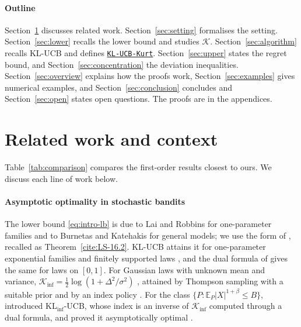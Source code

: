 \documentclass[11pt]{article}
\newcommand{\E}{\mathbb{E}}
\newcommand{\algo}{\hyperref[alg:kucb]{\texttt{KL-UCB-Kurt}}}
\begin{document}
\paragraph{Outline} Section~\ref{sec:related} discusses related work. Section~\ref{sec:setting} formalises
the setting. Section~\ref{sec:lower} recalls the lower bound and studies $\mathcal K$.
Section~\ref{sec:algorithm} recalls KL-UCB and defines \algo{}. Section~\ref{sec:upper} states the regret
bound, and Section~\ref{sec:concentration} the deviation inequalities. Section~\ref{sec:overview}
explains how the proofs work, Section~\ref{sec:examples} gives numerical examples, and
Section~\ref{sec:conclusion} concludes and Section~\ref{sec:open} states open questions. The proofs are in the
appendices.

\section{Related work and context}\label{sec:related}

Table~\ref{tab:comparison} compares the first-order results closest to ours. We discuss each line of
work below.

\paragraph{Asymptotic optimality in stochastic bandits} The lower bound \eqref{eq:intro-lb} is due to Lai
and Robbins for one-parameter families and to Burnetas and Katehakis for general models; we use the
form of \citet[Theorem~16.2]{LS}, recalled as Theorem~\ref{cite:LS-16.2}. KL-UCB attains it for
one-parameter exponential families and finitely supported laws \citep{CGMMS13}, and the dual formula of
\citet[Theorem~8]{HT10} gives the same for laws on $[0,1]$. For Gaussian laws with
unknown mean and variance, $\mathcal{K}_{\inf}=\frac12\log(1+\Delta^2/\sigma^2)$ \citep[equations~(2)--(3)]{HT14}, attained by
Thompson sampling with a suitable prior \citep[Theorem~1]{HT14} and by an index policy
\citep[Theorem~5]{CHK18}. For the class $\{P:\E_P|X|^{1+\beta}\le B\}$,
\citet{AJK21} introduced KL$_{\inf}$-UCB, whose index is an inverse of $\mathcal{K}_{\inf}$ computed through a dual
formula, and proved it asymptotically optimal \citep[Corollary~2, recalled as Lemma~\ref{cite:AJK21-cor2}]{AJK21}.
\end{document}
